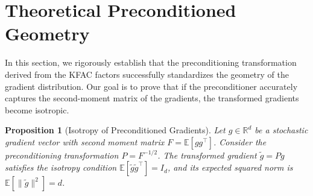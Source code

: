 \documentclass{article}
\theoremstyle{plain}
\newtheorem{proposition}[theorem]{Proposition}
\theoremstyle{definition}
\theoremstyle{remark}
\begin{document}
\section{Theoretical Preconditioned Geometry}
\label{app:proof_isotropy}

In this section, we rigorously establish that the preconditioning transformation derived from the KFAC factors successfully standardizes the geometry of the gradient distribution. Our goal is to prove that if the preconditioner accurately captures the second-moment matrix of the gradients, the transformed gradients become isotropic.

\begin{proposition}[Isotropy of Preconditioned Gradients]
\label{prop:isotropy}
Let $g \in \mathbb{R}^d$ be a stochastic gradient vector with second moment matrix $F = \mathbb{E}[g g^\top]$. Consider the preconditioning transformation $P = F^{-1/2}$. The transformed gradient $\tilde{g} = P g$ satisfies the isotropy condition $\mathbb{E}[\tilde{g} \tilde{g}^\top] = I_d$, and its expected squared norm is $\mathbb{E}[\|\tilde{g}\|^2] = d$.
\end{proposition}
\end{document}

